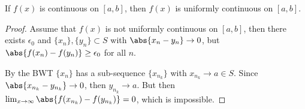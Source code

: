 \begin{thm}
If $f(x)$ is continuous on $[a,b]$, then $f(x)$ is uniformly continuous on $[a,b]$.
\end{thm}

\begin{proof}
Assume that $f(x)$ is not uniformly continuous on $[a,b]$, then there exists $\epsilon_0$ and $\{x_n\},\{y_n\}\subset S$ with $\abs{x_n-y_n} \to 0$, but $\abs{f(x_n)-f(y_n)}\geq \epsilon_0$ for all $n$.

By the BWT $\{x_n\}$ has a sub-sequence $\{x_{n_k}\}$ with $x_{n_k}\to a\in S$. Since $\abs{x_{n_k} - y_{n_k}}\to 0$, then $y_{n_k}\to a$. But then $\lim_{x\to\infty} \abs{f(x_{n_k}) - f(y_{n_k})} =0$, which is impossible.
\end{proof}